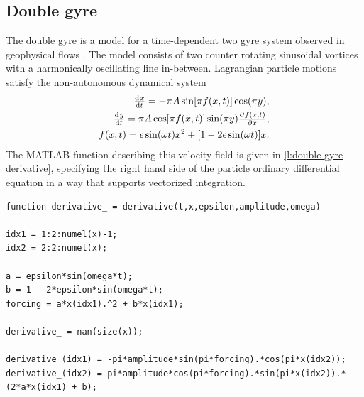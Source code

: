 \documentclass[5p]{elsarticle}
\begin{document}
\subsection{Double gyre}
The double gyre is a model for a time-dependent two gyre system observed in geophysical flows \citep{shadden05:_defin_lagran_lyapun}. The model consists of two counter rotating sinusoidal vortices with a harmonically oscillating line in-between. Lagrangian particle motions satisfy the non-autonomous dynamical system
\begin{equation}
\begin{split}
\od{x}{t} = -\pi A \sin[\pi f(x,t)] \cos(\pi y),\\
\od{y}{t} = \pi A \cos[\pi f(x,t)] \sin(\pi y) \pd{f(x,t)}{x},\\
f(x,t) = \epsilon \sin(\omega t) x^2 + [1 - 2 \epsilon \sin(\omega t)] x.
\end{split}
\label{eq:double gyre derivative equations}
\end{equation}
The MATLAB function describing this velocity field is given in \cref{l:double gyre derivative}, specifying the right hand side of the particle ordinary differential equation in a way that supports vectorized integration.

\begin{lstlisting}[caption={Double gyre derivative function corresponding to \cref{eq:double gyre derivative equations}.},label=l:double gyre derivative]
function derivative_ = derivative(t,x,epsilon,amplitude,omega)

idx1 = 1:2:numel(x)-1;
idx2 = 2:2:numel(x);

a = epsilon*sin(omega*t);
b = 1 - 2*epsilon*sin(omega*t);
forcing = a*x(idx1).^2 + b*x(idx1);

derivative_ = nan(size(x));

derivative_(idx1) = -pi*amplitude*sin(pi*forcing).*cos(pi*x(idx2));
derivative_(idx2) = pi*amplitude*cos(pi*forcing).*sin(pi*x(idx2)).*(2*a*x(idx1) + b);
\end{lstlisting}
\end{document}
